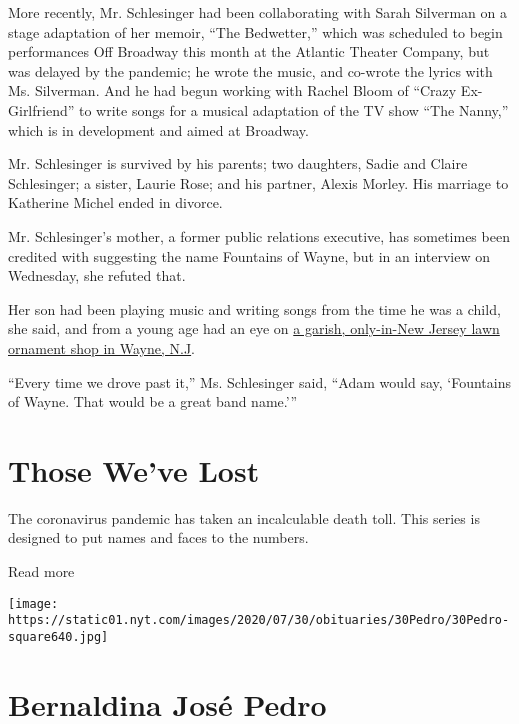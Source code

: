 More recently, Mr. Schlesinger had been collaborating with Sarah
Silverman on a stage adaptation of her memoir, ``The Bedwetter,'' which
was scheduled to begin performances Off Broadway this month at the
Atlantic Theater Company, but was delayed by the pandemic; he wrote the
music, and co-wrote the lyrics with Ms. Silverman. And he had begun
working with Rachel Bloom of ``Crazy Ex-Girlfriend'' to write songs for
a musical adaptation of the TV show ``The Nanny,'' which is in
development and aimed at Broadway.

Mr. Schlesinger is survived by his parents; two daughters, Sadie and
Claire Schlesinger; a sister, Laurie Rose; and his partner, Alexis
Morley. His marriage to Katherine Michel ended in divorce.

Mr. Schlesinger's mother, a former public relations executive, has
sometimes been credited with suggesting the name Fountains of Wayne, but
in an interview on Wednesday, she refuted that.

Her son had been playing music and writing songs from the time he was a
child, she said, and from a young age had an eye on
\href{https://www.roadsideamerica.com/blog/end-fountains-of-wayne/}{a
garish, only-in-New Jersey lawn ornament shop in Wayne, N.J}.

``Every time we drove past it,'' Ms. Schlesinger said, ``Adam would say,
`Fountains of Wayne. That would be a great band name.'''

\href{https://www.nytimes.com/interactive/2020/obituaries/people-died-coronavirus-obituaries.html?action=click\&pgtype=Article\&state=default\&region=BELOW_MAIN_CONTENT\&context=covid_obits_promo}{}

\hypertarget{those-weve-lost}{%
\section{Those We've Lost}\label{those-weve-lost}}

The coronavirus pandemic has taken an incalculable death toll. This
series is designed to put names and faces to the numbers.

Read more

\texttt{[image: https://static01.nyt.com/images/2020/07/30/obituaries/30Pedro/30Pedro-square640.jpg]}

\hypertarget{bernaldina-josuxe9-pedro}{%
\section{Bernaldina José Pedro}\label{bernaldina-josuxe9-pedro}}

